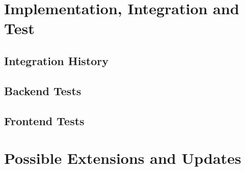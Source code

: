 \chapter{Implementation, Integration and Test}

\section{Integration History}

\section{Backend Tests}

\section{Frontend Tests}



\chapter{Possible Extensions and Updates}



